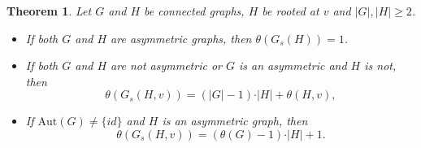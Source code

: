 \documentclass[12pt,a4paper, longbibliography]{article}
\newcommand{\aut}{\mathrm{Aut}}
\newtheorem{theorem}{{\color{THM} Theorem}}[section]
\theoremstyle{definition}
\numberwithin{equation}{section}
\begin{document}
	
	
	
	
	
	
	\begin{theorem}
		Let $G$ and $H$ be connected graphs, $H$ be rooted at $v$ and $\vert G \vert ,\vert H \vert\geq 2$.
\begin{itemize}
\item[a.]
 If both $G$ and $H$ are asymmetric graphs, then $\theta\left(G_s (H)\right)=1$.

\item[b.]
If both $G$ and $H$ are not asymmetric or $G$ is an asymmetric and $H$ is not, then
	\[
		\theta \left(G_s(H,v)\right)=\left(\vert G\vert-1\right)\cdot \vert H\vert+\theta (H,v),
		\]
		
\item[c.]
If $\aut(G) \ne \{id\}$ and $H$ is an asymmetric graph, then
\[
		\theta \left(G_s(H,v)\right)=\left(\theta(G)-1\right)\cdot \vert H\vert+1.
		\]

\end{itemize}
	\end{theorem}
\end{document}
